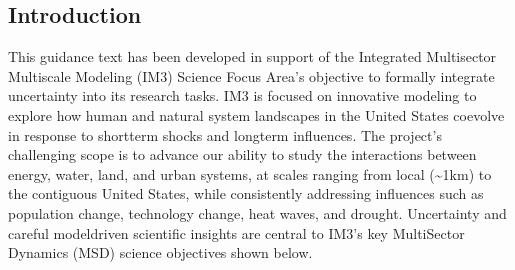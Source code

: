 \documentclass[letterpaper,10pt,english]{sphinxmanual}
\begin{document}
\subsection{Introduction}
\label{\detokenize{1.0_Introduction:introduction}}\label{\detokenize{1.0_Introduction::doc}}
\sphinxAtStartPar
This guidance text has been developed in support of the Integrated Multisector Multiscale Modeling (IM3) Science Focus Area’s objective to formally integrate uncertainty into its research tasks. IM3 is focused on innovative modeling to explore how human and natural system landscapes in the United States co\sphinxhyphen{}evolve in response to short\sphinxhyphen{}term shocks and long\sphinxhyphen{}term influences. The project’s challenging scope is to advance our ability to study the interactions between energy, water, land, and urban systems, at scales ranging from local (\textasciitilde{}1km) to the contiguous United States, while consistently addressing influences such as population change, technology change, heat waves, and drought. Uncertainty and careful model\sphinxhyphen{}driven scientific insights are central to IM3’s key MultiSector Dynamics (MSD) science objectives shown below.

\sphinxAtStartPar
{}

\sphinxAtStartPar
{}

\sphinxAtStartPar
{}

\sphinxAtStartPar
{}
\end{document}

